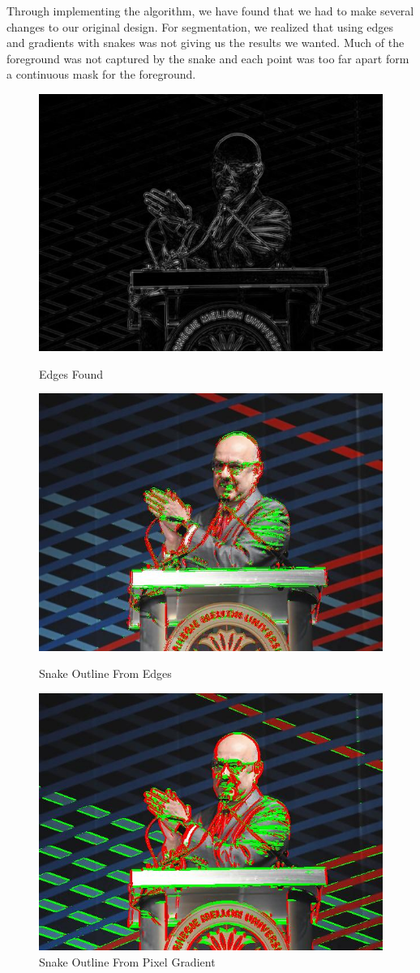 \documentclass[12pt]{article}
\begin{document}
Through implementing the algorithm, we have found that we had to make several
changes to our original design. For segmentation, we realized that using edges
and gradients with snakes was not giving us the results we wanted. Much of the
foreground was not captured by the snake and each point was too far apart form
a continuous mask for the foreground.

\begin{figure}[!htb]
    \begin{minipage}{0.30\textwidth}
        \centering
        \includegraphics[width=0.7\linewidth]{farnam_edge.jpg}
        \caption{Edges Found}
    \end{minipage}\hfill
    \begin{minipage}{0.30\textwidth}
        \centering
        \includegraphics[width=0.7\linewidth]{farnam_segmented.jpg}
        \caption{Snake Outline From Edges}
    \end{minipage}\hfill
    \begin{minipage}{0.30\textwidth}
        \centering
        \includegraphics[width=0.7\linewidth]{farnam_segmented_rough.jpg}
        \caption{Snake Outline From Pixel Gradient}
    \end{minipage}\hfill
\end{figure}
\end{document}
